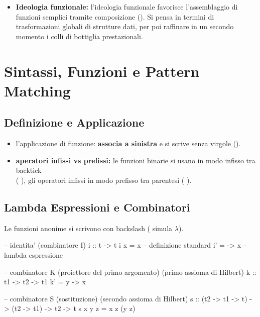 \documentclass[a4paper,11pt]{report}
\begin{document}
\begin{itemize}
\begin{itemize}
        \item \textbf{Ricorsione esplicita:} poiché il type system ci vieta di creare loop tramite l'auto-applicazione anonima di $\lambda x.xx$, in Haskell la non-terminazione si esprime unicamente attraverso la ricorsione esplicita. Definendo ad esempio , creiamo intenzionalmente una computazione divergente che il compilatore accetta, assegnandole il tipo più generale .
    \end{itemize}
    \item \textbf{Ideologia funzionale:} l'ideologia funzionale favorisce l'assemblaggio di funzioni semplici tramite composizione (). Si pensa in termini di trasformazioni globali di strutture dati, per poi raffinare in un secondo momento i colli di bottiglia prestazionali.
\end{itemize}

\section{Sintassi, Funzioni e Pattern Matching}

\subsection{Definizione e Applicazione}
\begin{itemize}
    \item l'applicazione di funzione: \textbf{associa a sinistra} e si scrive senza virgole ().
    \item \textbf{aperatori infissi vs prefissi:} le funzioni binarie si usano in modo infisso tra backtick \\ ( ), gli operatori infissi in modo prefisso tra parentesi ( ).
\end{itemize}

\subsection{Lambda Espressioni e Combinatori}
Le funzioni anonime si scrivono con backslash (\code{\textbackslash} simula $\lambda$).
\begin{haskellbox}{}
-- identita' (combinatore I)
i :: t -> t
i x = x           -- definizione standard
i' = \x -> x      -- lambda espressione

-- combinatore K (proiettore del primo argomento) (primo assioma di Hilbert)
k :: t1 -> t2 -> t1
k' = \x y -> x

-- combinatore S (sostituzione) (secondo assioma di Hilbert)
s :: (t2 -> t1 -> t) -> (t2 -> t1) -> t2 -> t
s x y z = x z (y z)
\end{haskellbox}
\end{document}
